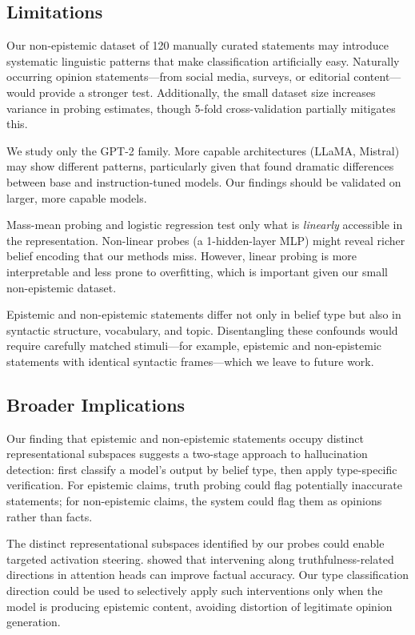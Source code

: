 \subsection{Limitations}

Our non-epistemic dataset of 120 manually curated statements may introduce systematic linguistic patterns that make classification artificially easy. Naturally occurring opinion statements---from social media, surveys, or editorial content---would provide a stronger test. Additionally, the small dataset size increases variance in probing estimates, though 5-fold cross-validation partially mitigates this.

We study only the GPT-2 family. More capable architectures (LLaMA, Mistral) may show different patterns, particularly given that \citet{bortoletto2024brittle} found dramatic differences between base and instruction-tuned models. Our findings should be validated on larger, more capable models.

Mass-mean probing and logistic regression test only what is \emph{linearly} accessible in the representation. Non-linear probes (\eg a 1-hidden-layer MLP) might reveal richer belief encoding that our methods miss. However, linear probing is more interpretable and less prone to overfitting, which is important given our small non-epistemic dataset.

Epistemic and non-epistemic statements differ not only in belief type but also in syntactic structure, vocabulary, and topic. Disentangling these confounds would require carefully matched stimuli---for example, epistemic and non-epistemic statements with identical syntactic frames---which we leave to future work.

\subsection{Broader Implications}

Our finding that epistemic and non-epistemic statements occupy distinct representational subspaces suggests a two-stage approach to hallucination detection: first classify a model's output by belief type, then apply type-specific verification. For epistemic claims, truth probing could flag potentially inaccurate statements; for non-epistemic claims, the system could flag them as opinions rather than facts.

The distinct representational subspaces identified by our probes could enable targeted activation steering. \citet{li2023inference} showed that intervening along truthfulness-related directions in attention heads can improve factual accuracy. Our type classification direction could be used to selectively apply such interventions only when the model is producing epistemic content, avoiding distortion of legitimate opinion generation.

